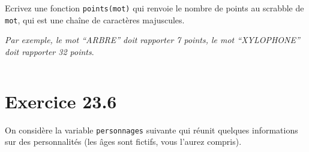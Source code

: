 \documentclass[12pt]{book}
\begin{document}
    Ecrivez une fonction \texttt{points(mot)} qui renvoie le nombre de
points au scrabble de \texttt{mot}, qui est une chaîne de caractères
majuscules.

\emph{Par exemple, le mot ``ARBRE'' doit rapporter 7 points, le mot
``XYLOPHONE'' doit rapporter 32 points}.

    \begin{tcolorbox}[breakable, size=fbox, boxrule=1pt, pad at break*=1mm,colback=cellbackground, colframe=cellborder]
\begin{Verbatim}[commandchars=\\\{\}]

\end{Verbatim}
\end{tcolorbox}

    \hypertarget{exercice-23.6}{%
\section{Exercice 23.6}\label{exercice-23.6}}

On considère la variable \texttt{personnages} suivante qui réunit
quelques informations sur des personnalités (les âges sont fictifs, vous
l'aurez compris).
\end{document}
